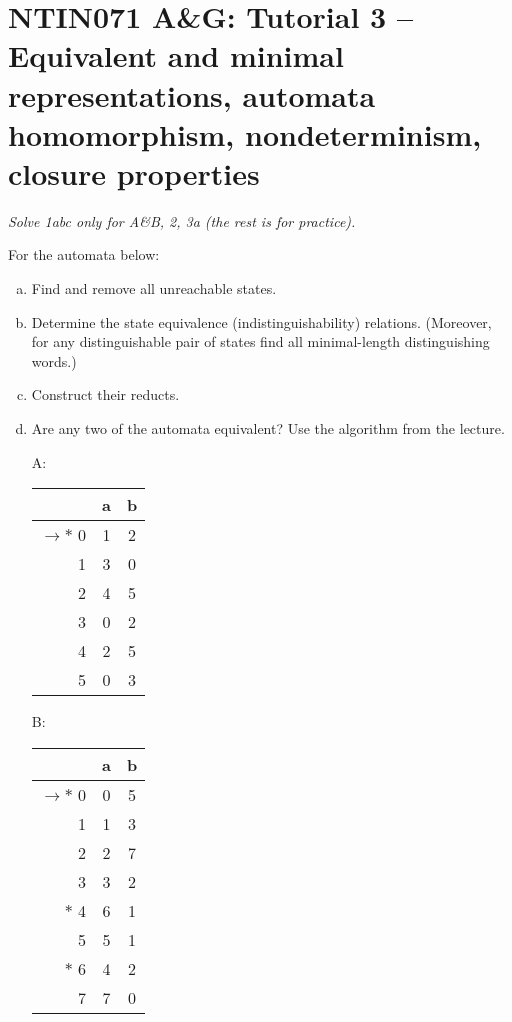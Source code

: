 \documentclass[a4paper,12pt]{amsart}
\begin{document}

\section*{NTIN071 A\&G: Tutorial 3 -- Equivalent and minimal representations, automata homomorphism, nondeterminism, closure properties}


\medskip

\noindent\emph{Solve 1abc only for A\&B, 2, 3a (the rest is for practice).}

\medskip


\medskip\begin{problem}    
    
    For the automata below:

    \begin{enumerate}[(a)]\setlength\itemsep{12pt}
        \item Find and remove all unreachable states.
        \item Determine the state equivalence (indistinguishability) relations. (Moreover, for any distinguishable pair of states find all minimal-length distinguishing words.)
        \item Construct their reducts.
        \item Are any two of the automata equivalent? Use the algorithm from the lecture.
    \end{enumerate}
    
    \begin{multicols}{3}
    
        \begin{itemize}
            \item[A:] \begin{tabular}{ r | c c }
            & a & b \\ \hline
            $\to\ast$ 0 & 1 & 2 \\  
            1 & 3 & 0 \\
            2 & 4 & 5 \\
            3 & 0 & 2 \\
            4 & 2 & 5 \\
            5 & 0 & 3
            \end{tabular}
            
            \item[B:] \begin{tabular}{ r | c c }
            & a & b \\ \hline
            $\to\ast$ 0 & 0 & 5 \\  
            1 & 1 & 3 \\
            2 & 2 & 7 \\
            3 & 3 & 2 \\
            $\ast$ 4 & 6 & 1 \\
            5 & 5 & 1 \\
            $\ast$ 6 & 4 & 2 \\
            7 & 7 & 0
            \end{tabular}
                

\end{itemize}
\end{multicols}
\end{problem}
\end{document}
